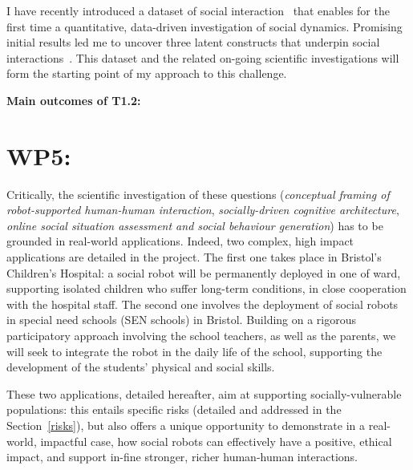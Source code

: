 \documentclass[11pt,a4paper]{report}
\begin{document}
I have recently introduced a dataset of social
interaction~\cite{lemaignan2018pinsoro} that enables for the first time a
quantitative, data-driven investigation of social dynamics. Promising initial
results led me to uncover three latent constructs that underpin social
interactions~\cite{bartlett2019what}. This dataset and the related on-going
scientific investigations will form the starting point of my approach to this
challenge.



\begin{framed}
    {\bf Main outcomes of T1.2:}
\end{framed}







\section{WP5: \textbf{\wpFive}}

Critically, the scientific investigation of these questions (\emph{conceptual
framing of robot-supported human-human interaction}, \emph{socially-driven
cognitive architecture},  \emph{online social situation assessment and social
behaviour generation}) has to be
grounded in real-world applications. Indeed, two complex, high impact
applications are detailed in the project. The first one takes place in
Bristol's Children's Hospital: a social robot will be permanently deployed in one
of ward, supporting isolated children who suffer long-term conditions, in close
cooperation with the hospital staff. The second one involves the deployment of 
social robots in special need schools (SEN schools) in Bristol. Building on a
rigorous participatory approach involving the school teachers, as well as the
parents, we will seek to integrate the robot in the daily life of the school,
supporting the development of the students' physical and social skills.

These two applications, detailed hereafter, aim at supporting
socially-vulnerable populations: this entails specific risks (detailed and
addressed in the Section~\ref{risks}), but also offers a unique opportunity to
demonstrate in a real-world, impactful case, how social robots can effectively
have a positive, ethical impact, and support in-fine stronger, richer
human-human interactions.
\end{document}
